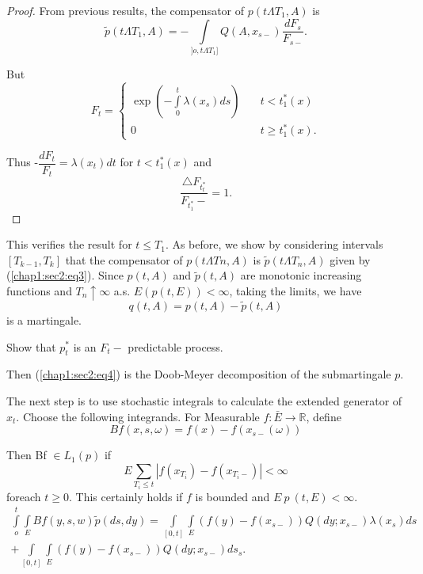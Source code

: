 \begin{proof}
  From previous results, the compensator of $p (t \Lambda T_1, A)$ is 
  $$
  \tilde{p}(t \Lambda T_1, A) = -\int\limits_{] o, t \Lambda T_1 ]} Q
  (A, x_{s-}) \frac{dF_s}{F_{s-}}. 
  $$
  
  But\pageoriginale  
  $$
  F_t = 
  \begin{cases} 
    \exp \left(- \int\limits_0^t \lambda(x_s)ds \right) & \quad t < t^*_1(x)\\
    0 & \quad t \geq t^*_1 (x).
  \end{cases}
  $$

  Thus -$\dfrac{dF_t}{F_t } = \lambda (x_t) dt$ for $t < t^*_1 (x) $ and 
  $$
  \frac{\triangle F_{t^*_t}}{F_{t^*_1}-} = 1.
  $$
\end{proof}

This verifies the result for $t \leq T_1$. As before, we show by
considering intervals $[T_{k-1}, T_k ]$ that the compensator of $p (t
  \Lambda Tn, A )$  is $\tilde{p}(t \Lambda T_n, A)$ given by
  (\ref{chap1:sec2:eq3}). Since $p(t,A)$ and $\tilde{p} (t, A)$ are monotonic
  increasing functions and $T_n \uparrow \infty$ a.s. $E (p(t,E)) <
  \infty$, taking the limits, we have  
  $$
  q(t,A) = p(t,A)- \tilde{p} (t,A)
  $$
  is a martingale.

\begin{exercise} %
  Show that $p^*_t $ is an $F_t-$ predictable process. 
\end{exercise}

Then (\ref{chap1:sec2:eq4}) is the Doob-Meyer decomposition of the
submartingale $p$.  

The next step is to use stochastic integrals to calculate the extended
generator of $x_t$. Choose the following integrands. For Measurable
$f: \bar{E} \to \mathbb{R}$, define  
$$
Bf(x,s,\omega) = f (x) - f(x_{s-} (\omega))
$$

Then Bf $\in  L_1 (p)$ if 
$$
E \sum_{T_i \leq t}| f(x_{T_i})- f(x_{T_i-})| < \infty 
$$
for\pageoriginale each $t \geq 0$. This certainly holds if $f$ is
bounded and $E ~p ~(t, E ) < \infty$.  
\begin{multline*}
  \int\limits_o^t \int\limits_E Bf(y, s,w) \tilde {p} (ds,dy) =
  \int\limits_{[ 0, t ]} \int\limits_{E} (f(y) - f(x_{s-}))
  Q(dy;x_{s-}) \lambda (x_s)ds\\ 
  + \int\limits_{[ 0, t ]} \int\limits_{E}(f(y) - f(x_{s-}))
  Q(dy;x_{s-})ds_{s}. \tag{5}\label{chap1:sec2:eq5} 
\end{multline*}

